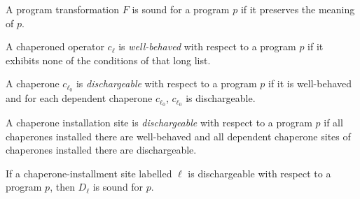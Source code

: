 \begin{definition}
A program transformation $F$ is sound for a program $p$ if it preserves the meaning of $p$.
\end{definition}

\begin{definition}
A chaperoned operator $c_\ell$ is \emph{well-behaved} with respect to a program $p$ if it exhibits none of the conditions of that long list.
\end{definition}


\begin{definition}
A chaperone $c_{\ell_0}$ is \emph{dischargeable} with respect to a program $p$ if it is well-behaved and for each dependent chaperone $c_{\ell_0}$, $c_{\ell_0}$ is dischargeable.
\end{definition}


\begin{definition}
A chaperone installation site is \emph{dischargeable} with respect to a program $p$ if all chaperones installed there are well-behaved and all dependent chaperone sites of chaperones installed there are dischargeable.
\end{definition}

\begin{theorem}
If a chaperone-installment site labelled $\ell$ is dischargeable with respect to a program $p$, then $D_\ell$ is sound for $p$.
\end{theorem}



